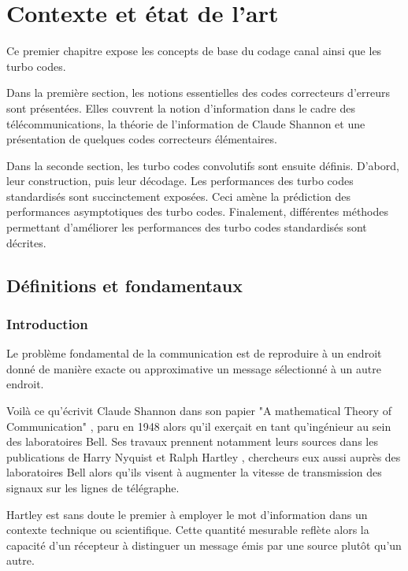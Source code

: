 
\chapter{Contexte et état de l'art}
Ce premier chapitre expose les concepts de base du codage canal ainsi que les turbo codes.

Dans la première section, les notions essentielles des codes correcteurs d'erreurs sont présentées. Elles couvrent la notion 
d'information dans le cadre des télécommunications, la théorie de l'information de Claude Shannon et une présentation de 
quelques codes correcteurs élémentaires.

Dans la seconde section, les turbo codes convolutifs sont ensuite définis. D'abord, leur construction, puis leur décodage. 
Les performances des turbo codes standardisés sont succinctement exposées. Ceci amène la prédiction des performances 
asymptotiques des turbo codes. Finalement, différentes méthodes permettant d'améliorer les performances des turbo codes 
standardisés sont décrites. 

\vspace*{\fill}
\minitocTITI
\vspace*{\fill}

\section{Définitions et fondamentaux}

\subsection{Introduction}
\og Le problème fondamental de la communication est de reproduire à un endroit donné de manière exacte ou approximative 
un message sélectionné à un autre endroit.\fg

Voilà ce qu'écrivit Claude Shannon dans son papier "A mathematical Theory of Communication" \cite{shannon_mathematical_2001}, 
paru en 1948 alors qu'il exerçait en tant qu'ingénieur au sein des laboratoires Bell. Ses travaux prennent notamment 
leurs sources dans les publications de Harry Nyquist \cite{nyquist_telegraph} et Ralph Hartley \cite{hartley_trans}, 
chercheurs eux aussi auprès des laboratoires Bell alors qu'ils visent à augmenter la vitesse de transmission des signaux sur 
les lignes de télégraphe. 

Hartley est sans doute le premier à employer le mot d'information dans un contexte technique ou scientifique. Cette 
quantité mesurable reflète alors la capacité d'un récepteur à distinguer un message émis par une 
source plutôt qu'un autre.

